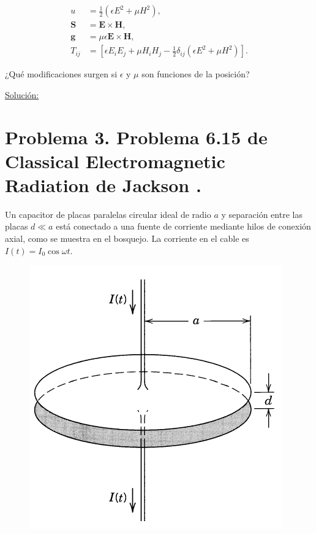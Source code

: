 \documentclass[a4paper,11pt]{article}
\numberwithin{equation}{section}
\begin{document}
\begin{align*}
u &= \frac{1}{2}(\epsilon E^2 + \mu H^2), \\
\mathbf{S} &= \mathbf{E} \times \mathbf{H}, \\
\mathbf{g} &= \mu\epsilon \mathbf{E} \times \mathbf{H}, \\
T_{ij} &= [\epsilon E_iE_j + \mu H_iH_j - \frac{1}{2}\delta_{ij}(\epsilon E^2 + \mu H^2)].
\end{align*}

¿Qué modificaciones surgen si $\epsilon$ y $\mu$ son funciones de la posición?

\vspace{.3cm}

\underline{Solución:} \vspace{.3cm}

\newpage

\section{Problema 3. Problema 6.15 de Classical Electromagnetic Radiation
de Jackson \cite{jackson}.}

Un capacitor de placas paralelas circular ideal de radio $a$ y separación entre 
las placas $d \ll a$ está conectado a una fuente de corriente mediante hilos de 
conexión axial, como se muestra en el bosquejo. La corriente en el cable es 
$I(t) = I_0\cos{\omega t}$.

\begin{figure}[H]
 \center 
 \includegraphics[scale=0.5]{problema3fig1}
\end{figure}
\end{document}
